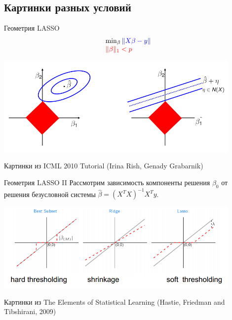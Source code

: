 \documentclass[14pt, fleqn, xcolor={dvipsnames, table}]{beamer}
\begin{document}
\subsection{Картинки разных условий}

\begin{frame}{Геометрия LASSO}
$$\begin{array}{l}
\min_\beta {\color{blue} \|X\beta - y\|} \\
{\color{red} \|\beta\|_1 < p}
\end{array}$$
\begin{center}
\includegraphics[width=0.9\textwidth]{Geometric_View.png} 
\end{center}
\footnotesize
Картинки из ICML 2010 Tutorial (Irina Rish, Genady Grabarnik)
\end{frame}

\begin{frame}{Геометрия LASSO II}
\small
Рассмотрим зависимость компоненты решения $\beta_0$ от решения безусловной системы $\hat{\beta} = \left(X^TX\right)^{-1}X^Ty$.
\begin{center}
\includegraphics[width=0.9\textwidth]{shrinkage.png} 
\end{center}
\footnotesize
Картинки из The Elements of Statistical Learning (Hastie, Friedman and Tibshirani, 2009)
\end{frame}
\end{document}
